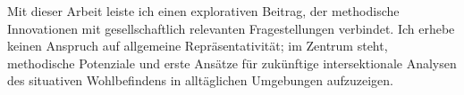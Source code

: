 Mit dieser Arbeit leiste ich einen explorativen Beitrag, der methodische Innovationen mit gesellschaftlich relevanten Fragestellungen verbindet. Ich erhebe keinen Anspruch auf allgemeine Repräsentativität; im Zentrum steht, methodische Potenziale und erste Ansätze für zukünftige intersektionale Analysen des situativen Wohlbefindens in alltäglichen Umgebungen aufzuzeigen.
